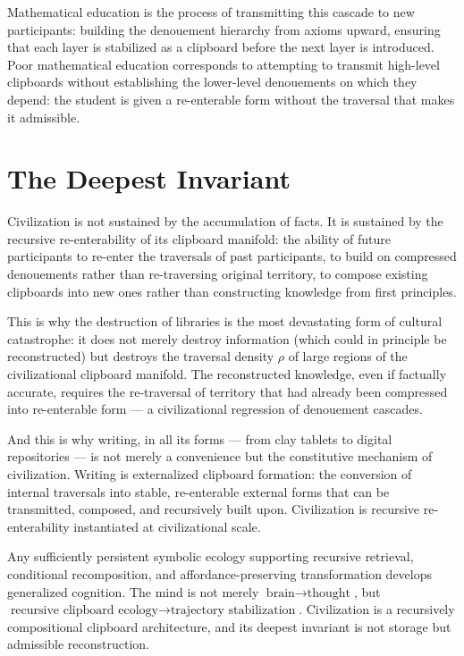 \documentclass[12pt,oneside]{book}
\newcounter{thesisctr}
\newenvironment{thesis}[1][]{%
  \refstepcounter{thesisctr}%
  \begin{tcolorbox}[
    enhanced,
    breakable,
    colback=cliplight,
    colframe=clipblue,
    fonttitle=\bfseries\small,
    title={Thesis~\thethesisctr\ifx&#1&\else~(#1)\fi},
    left=6pt, right=6pt, top=4pt, bottom=4pt,
    arc=2pt
  ]
}{%
  \end{tcolorbox}
}
\theoremstyle{plain}
\theoremstyle{definition}
\theoremstyle{plain}
\begin{document}
Mathematical education is the process of transmitting this cascade to new participants: building the denouement hierarchy from axioms upward, ensuring that each layer is stabilized as a clipboard before the next layer is introduced. Poor mathematical education corresponds to attempting to transmit high-level clipboards without establishing the lower-level denouements on which they depend: the student is given a re-enterable form without the traversal that makes it admissible.

\section{The Deepest Invariant}

Civilization is not sustained by the accumulation of facts. It is sustained by the recursive re-enterability of its clipboard manifold: the ability of future participants to re-enter the traversals of past participants, to build on compressed denouements rather than re-traversing original territory, to compose existing clipboards into new ones rather than constructing knowledge from first principles.

This is why the destruction of libraries is the most devastating form of cultural catastrophe: it does not merely destroy information (which could in principle be reconstructed) but destroys the traversal density $\rho$ of large regions of the civilizational clipboard manifold. The reconstructed knowledge, even if factually accurate, requires the re-traversal of territory that had already been compressed into re-enterable form — a civilizational regression of denouement cascades.

And this is why writing, in all its forms — from clay tablets to digital repositories — is not merely a convenience but the constitutive mechanism of civilization. Writing is externalized clipboard formation: the conversion of internal traversals into stable, re-enterable external forms that can be transmitted, composed, and recursively built upon. Civilization is recursive re-enterability instantiated at civilizational scale.

\begin{thesis}[Recursive Clipboard Ontology]
Any sufficiently persistent symbolic ecology supporting recursive retrieval, conditional recomposition, and affordance-preserving transformation develops generalized cognition. The mind is not merely $\text{brain} \to \text{thought}$, but $\text{recursive clipboard ecology} \to \text{trajectory stabilization}$. Civilization is a recursively compositional clipboard architecture, and its deepest invariant is not storage but admissible reconstruction.
\end{thesis}
\end{document}
